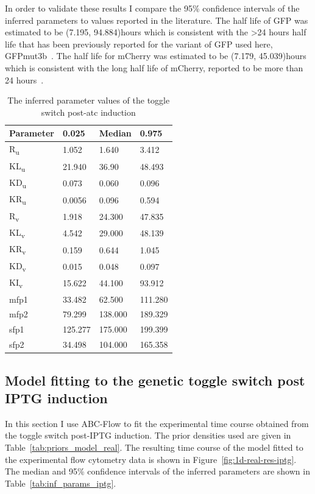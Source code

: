 In order to validate these results I compare the 95\% confidence intervals of the inferred parameters to values reported in the literature. The half life of GFP was estimated to be (7.195, 94.884)hours which is consistent with the \textgreater 24 hours half life that has been previously reported for the variant of GFP used here, GFPmut3b~\autocite{Andersen:1998tn}. The half life for mCherry was estimated to be (7.179, 45.039)hours which is consistent with the long half life of mCherry, reported to be more than 24 hours~\autocite{Shaner:2004vy}. 


\begin{table}[tb]
\centering
\caption{The inferred parameter values of the toggle switch post-\acrshort{atc} induction}
\label{tab:inf_params_atc}
\begin{tabular}{@{}llll@{}}
\toprule
Parameter & 0.025 & Median & 0.975 \\ \midrule
R\textsubscript{u} & 1.052 & 1.640 & 3.412 \\
KL\textsubscript{u} & 21.940 & 36.90 & 48.493 \\
KD\textsubscript{u} & 0.073 & 0.060 & 0.096 \\
KR\textsubscript{u} & 0.0056 & 0.096 & 0.594 \\
R\textsubscript{v} & 1.918 & 24.300 & 47.835 \\
KL\textsubscript{v} & 4.542 & 29.000 & 48.139 \\
KR\textsubscript{v} & 0.159 & 0.644 & 1.045 \\
KD\textsubscript{v} & 0.015 & 0.048 & 0.097 \\
KI\textsubscript{v} & 15.622 & 44.100 & 93.912 \\
mfp1 & 33.482 & 62.500 & 111.280 \\
mfp2 & 79.299 & 138.000 & 189.329 \\
sfp1 & 125.277 & 175.000 & 199.399 \\
sfp2 & 34.498 & 104.000 & 165.358 \\ \bottomrule
\end{tabular}
\end{table}


\subsection{Model fitting to the genetic toggle switch post IPTG induction}
In this section I use ABC-Flow to fit the experimental time course obtained from the toggle switch post-IPTG induction. The prior densities used are given in Table~\ref{tab:priors_model_real}. The resulting time course of the model fitted to the experimental flow cytometry data is shown in Figure~\ref{fig:1d-real-res-iptg}. The median and 95\% confidence intervals of the inferred parameters are shown in Table~\ref{tab:inf_params_iptg}.


